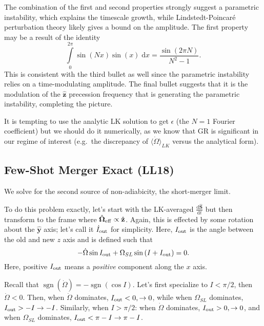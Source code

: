 \documentclass[11pt,
        usenames, %
        dvipsnames %
    ]{article}
\newcommand*{\rd}[2]{\frac{\mathrm{d}#1}{\mathrm{d}#2}}
\newcommand*{\bm}[1]{\boldsymbol{\mathbf{#1}}}
\newcommand*{\uv}[1]{\hat{\bm{#1}}}
\DeclareMathOperator{\sgn}{sgn}
\newcommand*{\ev}[1]{\langle#1\rangle}
\newcommand*{\p}[1]{\left(#1\right)}
\begin{document}
The combination of the first and second properties strongly suggest a parametric
instability, which explains the timescale growth, while Lindstedt-Poincar\'e
perturbation theory likely gives a bound on the amplitude. The first property
may be a result of the identity
\begin{equation}
    \int\limits_0^{2\pi} \sin\p{Nx} \sin(x)\;\mathrm{d}x
        = \frac{\sin \p{2\pi N}}{N^2 - 1}.
\end{equation}
This is consistent with the third bullet as well since the parametric
instability relies on a time-modulating amplitude. The final bullet suggests
that it is the modulation of the $\uv{z}$ precession frequency that is
generating the parametric instability, completing the picture.

It is tempting to use the analytic LK solution to get $\epsilon$ (the $N = 1$
Fourier coefficient) but we should do it numerically, as we know that GR is
significant in our regime of interest (e.g.\ the discrepancy of
$\ev{\dot{\Omega}}_{LK}$ versus the analytical form).

\subsection{Few-Shot Merger Exact (LL18)}

We solve for the second source of non-adiabicity, the short-merger limit.

To do this problem exactly, let's start with the LK-averaged $\rd{\uv{S}}{t}$
but then transform to the frame where $\uv{\Omega}_{\rm eff} \propto \uv{z}$.
Again, this is effected by some rotation about the $\uv{y}$ axis; let's call it
$\dot{I}_{\rm out}$ for simplicity. Here, $I_{\rm out}$ is the angle between the
old and new $z$ axis and is defined such that
\begin{equation}
    -\dot{\Omega} \sin I_{\rm out} + \Omega_{SL}\sin \p{I + I_{\rm out}}
        = 0.\label{eq:I_out_def}
\end{equation}
Here, positive $I_{\rm out}$ means a \emph{positive} component along the $x$
axis.

Recall that $\sgn(\dot{\Omega}) = -\sgn(\cos I)$. Let's first specialize to $I <
\pi/2$, then $\dot{\Omega} < 0$. Then, when $\dot{\Omega}$ dominates, $I_{\rm
out} < 0, \to 0$, while when $\Omega_{SL}$ dominates, $I_{\rm out} > -I \to -I$.
Similarly, when $I > \pi/2$: when $\dot{\Omega}$ dominates, $I_{\rm out} > 0,
\to 0$, and when $\Omega_{SL}$ dominates, $I_{\rm out} < \pi - I \to \pi - I$.
\end{document}
